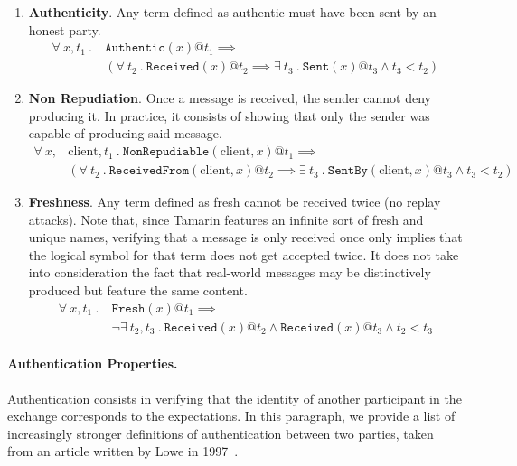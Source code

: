 \begin{enumerate}
    \item \textbf{Authenticity}. Any term defined as authentic must have been sent by an honest party.
        \begin{align*}
            \forall \ x, t_1 \ . \ &\mathtt{Authentic}(x) @ t_1 \implies\\
            &\left( \forall \ t_2 \ . \ \mathtt{Received}(x) @ t_2 \implies \exists \ t_3 \ . \ \mathtt{Sent}(x) @ t_3 \land t_3 < t_2\right)
        \end{align*}
    \item \textbf{Non Repudiation}. Once a message is received, the sender cannot deny producing it. In practice, it consists of showing that only the sender was capable of producing said message.
            \begin{align*}
                \forall \ x,&\text{client},t_1 \ . \ \mathtt{NonRepudiable}(\text{client},x)@t_1 \implies\\
                &(\forall \ t_2 \ . \ \mathtt{ReceivedFrom}(\text{client},x)@t_2 \implies \exists \ t_3 \ . \ \mathtt{SentBy}(\text{client},x)@t_3 \land t_3 < t_2)
            \end{align*}
    \item \textbf{Freshness}. Any term defined as fresh cannot be received twice (no replay attacks). Note that, since Tamarin features an infinite sort of fresh and unique names, verifying that a message is only received once only implies that the logical symbol for that term does not get accepted twice. It does not take into consideration the fact that real-world messages may be distinctively produced but feature the same content.
        \begin{align*}
            \forall \ x,t_1 \ . \ &\mathtt{Fresh}(x) @ t_1 \implies\\
            &\neg \exists \ t_2,t_3 \ . \ \mathtt{Received}(x)@t_2 \land \mathtt{Received}(x)@t_3 \land t_2 < t_3
        \end{align*}
\end{enumerate}

\paragraph{\textbf{Authentication Properties}.} Authentication consists in verifying that the identity of another participant in the exchange corresponds to the expectations. In this paragraph, we provide a list of increasingly stronger definitions of authentication between two parties, taken from an article written by Lowe in 1997~\cite{hierarchy}.

